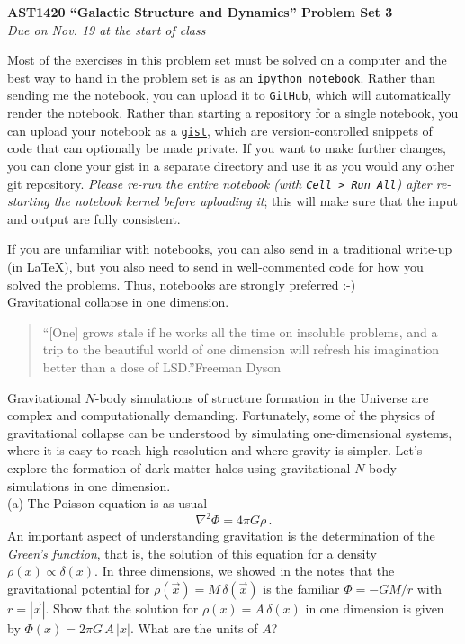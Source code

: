 \documentclass[12pt]{article}
\begin{document}
\begin{center}
{\bf \LARGE AST1420 ``Galactic Structure and Dynamics'' Problem Set 3}\\[7pt]
\emph{Due on Nov. 19 at the start of class}\\[7pt]
\end{center}

Most of the exercises in this problem set must be solved on a computer
and the best way to hand in the problem set is as an \texttt{ipython
  notebook}. Rather than sending me the notebook, you can upload it to
\texttt{GitHub}, which will automatically render the notebook. Rather
than starting a repository for a single notebook, you can upload your
notebook as a \texttt{\href{https://gist.github.com/}{gist}}, which
are version-controlled snippets of code that can optionally be made
private. If you want to make further changes, you can clone your gist
in a separate directory and use it as you would any other git
repository. \emph{Please re-run the entire notebook (with \texttt{Cell
    > Run All}) after re-starting the notebook kernel before uploading
  it}; this will make sure that the input and output are fully
consistent.

If you are unfamiliar with notebooks, you can also send in a
traditional write-up (in LaTeX), but you also need to send in
well-commented code for how you solved the problems. Thus, notebooks
are strongly preferred :-)\\

 Gravitational collapse in one dimension.

\begin{quote}
  ``[One] grows stale if he works all the time on insoluble problems, and a trip to the beautiful world of one dimension will refresh his imagination better than a dose of LSD.''\flushright Freeman Dyson
\end{quote}

Gravitational $N$-body simulations of structure formation in the
Universe are complex and computationally demanding. Fortunately, some
of the physics of gravitational collapse can be understood by
simulating one-dimensional systems, where it is easy to reach high
resolution and where gravity is simpler. Let's explore the formation
of dark matter halos using gravitational $N$-body simulations in one
dimension.\\

(a) The Poisson equation is as usual
\begin{equation}
  \nabla^2 \Phi = 4\pi G \rho\,.
\end{equation}
An important aspect of understanding gravitation is the determination
of the \emph{Green's function}, that is, the solution of this equation
for a density $\rho(x) \propto \delta(x)$. In three dimensions, we
showed in the notes that the gravitational potential for
$\rho(\vec{x}) = M\,\delta(\vec{x})$ is the familiar $\Phi = -GM/r$
with $r = |\vec{x}|$. Show that the solution for $\rho(x) =
A\,\delta(x)$ in one dimension is given by $\Phi(x) = 2\pi
G\,A\,|x|$. What are the units of $A$?\\
\end{document}
